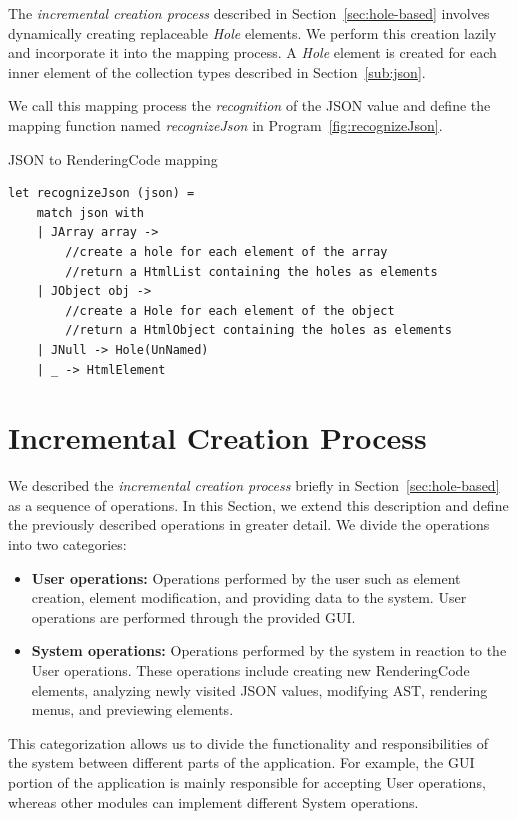 The \emph{incremental creation process} described in Section~\ref{sec:hole-based} involves dynamically creating replaceable \emph{Hole} elements.
We perform this creation lazily and incorporate it into the mapping process.
A \emph{Hole} element is created for each inner element of the collection types described in Section~\ref{sub:json}.

We call this mapping process the \emph{recognition} of the JSON value and define the mapping function named \emph{recognizeJson} in Program~\ref{fig:recognizeJson}.

\begin{listing}[H]
	\caption {JSON to RenderingCode mapping}
	\label{fig:recognizeJson}
	\begin{lstlisting}
let recognizeJson (json) =
    match json with
    | JArray array -> 
        //create a hole for each element of the array
        //return a HtmlList containing the holes as elements
    | JObject obj ->
        //create a Hole for each element of the object 
        //return a HtmlObject containing the holes as elements
    | JNull -> Hole(UnNamed)
    | _ -> HtmlElement 
  \end{lstlisting}
\end{listing}

\section{Incremental Creation Process}
\label{sec:creation}
We described the \emph{incremental creation process} briefly in Section~\ref{sec:hole-based} as a sequence of operations.
In this Section, we extend this description and define the previously described operations in greater detail.
We divide the operations into two categories:
\begin{itemize}
	\item \textbf{User operations:} Operations performed by the user such as element creation, element modification, and providing data to the system.
	      User operations are performed through the provided GUI.
	\item \textbf{System operations:} Operations performed by the system in reaction to the User operations.
	      These operations include creating new RenderingCode elements, analyzing newly visited JSON values, modifying AST, rendering menus, and previewing elements.
\end{itemize}
This categorization allows us to divide the functionality and responsibilities of the system between different parts of the application.
For example, the GUI portion of the application is mainly responsible for accepting User operations, whereas other modules can implement different System operations.

